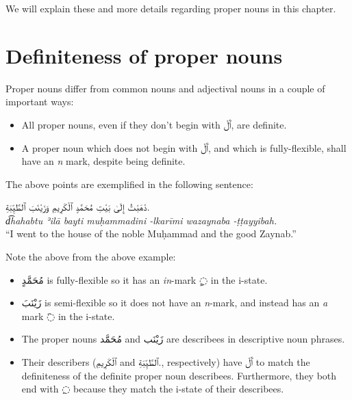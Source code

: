\documentclass[
  10pt,
]{book}
\providecommand{\tightlist}{%
  \setlength{\itemsep}{0pt}\setlength{\parskip}{0pt}}
\begin{document}
We will explain these and more details regarding proper nouns in this chapter.

\section{Definiteness of proper nouns}\label{definiteness-of-proper-nouns}

Proper nouns differ from common nouns and adjectival nouns in a couple of important ways:

\begin{itemize}
\tightlist
\item
  All proper nouns, even if they don't begin with \foreignlanguage{arabic}{ٱَلْ}, are definite.
\item
  A proper noun which does not begin with \foreignlanguage{arabic}{ٱَلْ}, and which is fully-flexible, shall have an \emph{n} mark, despite being definite.
\end{itemize}

The above points are exemplified in the following sentence:

\foreignlanguage{arabic}{ذَهَبْتُ إِلَىٰ بَيْتِ مُحَمَّدٍ ٱلْکَرِيمِ وَزَيْنَبَ ٱلطَّيِّبَةِ.}\\
\emph{d͡hahabtu ʾilā bayti muḥammadini -lkarīmi wazaynaba -ṭṭayyibah.}\\
\enquote{I went to the house of the noble Muḥammad and the good Zaynab.}

Note the above from the above example:

\begin{itemize}
\tightlist
\item
  \foreignlanguage{arabic}{مُحَمَّدٍ} is fully-flexible so it has an \emph{in}-mark \foreignlanguage{arabic}{◌ٍ} in the i-state.
\item
  \foreignlanguage{arabic}{زَيْنَبَ} is semi-flexible so it does not have an \emph{n}-mark, and instead has an \emph{a} mark \foreignlanguage{arabic}{◌َ} in the i-state.
\item
  The proper nouns \foreignlanguage{arabic}{مُحَمَّد} and \foreignlanguage{arabic}{زَيْنَب} are describees in descriptive noun phrases.
\item
  Their describers (\foreignlanguage{arabic}{ٱلْکَرِيمِ} and \foreignlanguage{arabic}{ٱلطَّيِّبَةِ.}, respectively) have \foreignlanguage{arabic}{ٱَلْ} to match the definiteness of the definite proper noun describees. Furthermore, they both end with \foreignlanguage{arabic}{◌ِ} because they match the i-state of their describees.
\end{itemize}
\end{document}
